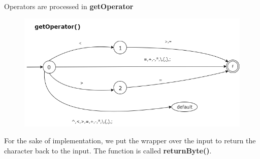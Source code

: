 \documentclass[12pt,a4paper,titlepage]{report}
\begin{document}
\vspace{0.4cm}

\begin{justify}
Operators are processed in \textbf{getOperator}
\end{justify}

\vspace{0.3cm}

\begin{figure}
  \begin{center}
    \includegraphics[width=1.0\textwidth]{img/getOperator.png}
  \end{center}
\end{figure}

\vspace{0.4cm}


\begin{justify}
For the sake of implementation, we put the wrapper over the input to return the character back to the input. The function is called \textbf{returnByte()}.
\end{justify}

\end{document}
